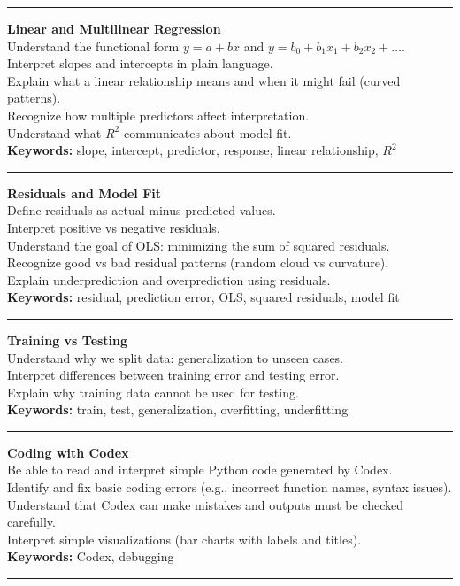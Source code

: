 \documentclass[12pt]{article}
\begin{document}
\bigskip
\hrule
\bigskip


\noindent
\textbf{Linear and Multilinear Regression} \\[4pt]
Understand the functional form \(y = a + bx\) and \(y = b_0 + b_1 x_1 + b_2 x_2 + \dots\).\\
Interpret slopes and intercepts in plain language.\\
Explain what a linear relationship means and when it might fail (curved patterns).\\
Recognize how multiple predictors affect interpretation.\\
Understand what \(R^2\) communicates about model fit.\\
\textbf{Keywords:} slope, intercept, predictor, response, linear relationship, \(R^2\)

\bigskip
\hrule
\bigskip


\noindent
\textbf{Residuals and Model Fit} \\[4pt]
Define residuals as actual minus predicted values.\\
Interpret positive vs negative residuals.\\
Understand the goal of OLS: minimizing the sum of squared residuals.\\
Recognize good vs bad residual patterns (random cloud vs curvature).\\
Explain underprediction and overprediction using residuals.\\
\textbf{Keywords:} residual, prediction error, OLS, squared residuals, model fit

\bigskip
\hrule
\bigskip

\clearpage

\noindent
\textbf{Training vs Testing} \\[4pt]
Understand why we split data: generalization to unseen cases.\\
Interpret differences between training error and testing error.\\
Explain why training data cannot be used for testing.\\
\textbf{Keywords:} train, test, generalization, overfitting, underfitting

\bigskip
\hrule
\bigskip

\noindent
\textbf{Coding with Codex} \\[4pt]
Be able to read and interpret simple Python code generated by Codex.\\
Identify and fix basic coding errors (e.g., incorrect function names, syntax issues).\\
Understand that Codex can make mistakes and outputs must be checked carefully.\\
Interpret simple visualizations (bar charts with labels and titles).\\
\textbf{Keywords:} Codex, debugging

\bigskip
\hrule
\bigskip
\end{document}
